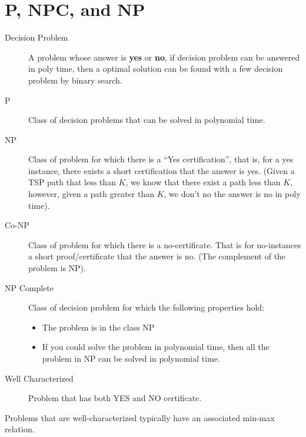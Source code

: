 \chapter{P, NPC, and NP}
\begin{description}
    \item[Decision Problem] A problem whose answer is \textbf{yes} or
        \textbf{no}, if decision problem can be answered in poly time,
        then a optimal solution can be found with a few decision problem
        by binary search.
    \item[P]  Class of decision problems that can be solved in polynomial
        time. 
    \item[NP] Class of problem for which there is a ``Yes certification'',
        that is, for a yes instance, there exists a short certification
        that the answer is yes. (Given a TSP path that less than $K$, we
        know that there exist a path less than $K$, however, given a path
        greater than $K$, we don't no the answer is no in poly time).
    \item[Co-NP] Class of problem for which there is a no-certificate.
        That is for no-instances a short proof/certificate that the answer
        is no. (The complement of the problem is NP).
    \item[NP Complete] Class of decision problem for which the following
        properties hold:
        \begin{itemize}
            \item The problem is in the class NP
            \item If you could  solve the problem in polynomial time, then
                all the problem in NP can be solved in polynomial time.
        \end{itemize}
    \item[Well Characterized] Problem that has both YES and NO
        certificate.
\end{description}

Problems that are well-characterized typically have an associated min-max
relation.
